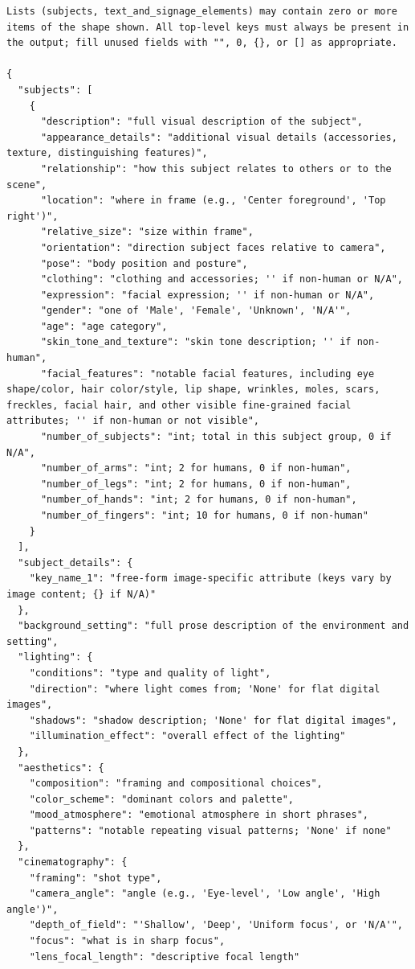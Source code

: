 \begin{tcolorbox}
\begin{Verbatim}[breaklines=true,breakanywhere=true,fontsize=\scriptsize]
Lists (subjects, text_and_signage_elements) may contain zero or more items of the shape shown. All top-level keys must always be present in the output; fill unused fields with "", 0, {}, or [] as appropriate.

{
  "subjects": [
    {
      "description": "full visual description of the subject",
      "appearance_details": "additional visual details (accessories, texture, distinguishing features)",
      "relationship": "how this subject relates to others or to the scene",
      "location": "where in frame (e.g., 'Center foreground', 'Top right')",
      "relative_size": "size within frame",
      "orientation": "direction subject faces relative to camera",
      "pose": "body position and posture",
      "clothing": "clothing and accessories; '' if non-human or N/A",
      "expression": "facial expression; '' if non-human or N/A",
      "gender": "one of 'Male', 'Female', 'Unknown', 'N/A'",
      "age": "age category",
      "skin_tone_and_texture": "skin tone description; '' if non-human",
      "facial_features": "notable facial features, including eye shape/color, hair color/style, lip shape, wrinkles, moles, scars, freckles, facial hair, and other visible fine-grained facial attributes; '' if non-human or not visible",
      "number_of_subjects": "int; total in this subject group, 0 if N/A",
      "number_of_arms": "int; 2 for humans, 0 if non-human",
      "number_of_legs": "int; 2 for humans, 0 if non-human",
      "number_of_hands": "int; 2 for humans, 0 if non-human",
      "number_of_fingers": "int; 10 for humans, 0 if non-human"
    }
  ],
  "subject_details": {
    "key_name_1": "free-form image-specific attribute (keys vary by image content; {} if N/A)"
  },
  "background_setting": "full prose description of the environment and setting",
  "lighting": {
    "conditions": "type and quality of light",
    "direction": "where light comes from; 'None' for flat digital images",
    "shadows": "shadow description; 'None' for flat digital images",
    "illumination_effect": "overall effect of the lighting"
  },
  "aesthetics": {
    "composition": "framing and compositional choices",
    "color_scheme": "dominant colors and palette",
    "mood_atmosphere": "emotional atmosphere in short phrases",
    "patterns": "notable repeating visual patterns; 'None' if none"
  },
  "cinematography": {
    "framing": "shot type",
    "camera_angle": "angle (e.g., 'Eye-level', 'Low angle', 'High angle')",
    "depth_of_field": "'Shallow', 'Deep', 'Uniform focus', or 'N/A'",
    "focus": "what is in sharp focus",
    "lens_focal_length": "descriptive focal length"

\end{Verbatim}
\end{tcolorbox}
